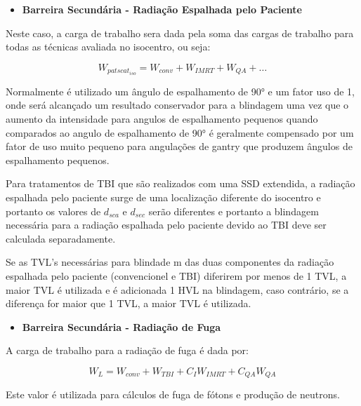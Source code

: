 \documentclass[11pt,a4paper]{article}
\begin{document}
        \begin{itemize}
            \item \textbf{\textcolor{CarnationPink}{Barreira Secundária - Radiação Espalhada pelo Paciente}}
        \end{itemize}

        Neste caso, a carga de trabalho sera dada pela soma das cargas de trabalho para todas as técnicas avaliada no isocentro, ou seja:

        \begin{equation}
            W_{pat scat_{iso}} = W_{conv} + W_{IMRT} + W_{QA} + \dots
        \end{equation}

        Normalmente é utilizado um ângulo de espalhamento de \ang{90} e um fator uso de 1, onde será alcançado um resultado conservador para a blindagem uma vez que o aumento da intensidade para angulos de espalhamento pequenos quando comparados ao angulo de espalhamento de \ang{90} é geralmente compensado por um fator de uso muito pequeno para angulações de gantry que produzem ângulos de espalhamento pequenos.

        Para tratamentos de TBI que são realizados com uma SSD extendida, a radiação espalhada pelo paciente surge de uma localização diferente  do isocentro e portanto os valores de $d_{sca}$ e $d_{sec}$ serão diferentes e portanto a blindagem necessária para a radiação espalhada pelo paciente devido ao TBI deve ser calculada separadamente.

        Se as TVL's necessárias para blindade m das duas componentes da radiação espalhada pelo paciente (convencionel e TBI) diferirem por menos de 1 TVL, a maior TVL é utilizada e é adicionada 1 HVL na blindagem, caso contrário, se a diferença for maior que 1 TVL, a maior TVL é utilizada. 

        \begin{itemize}
            \item \textbf{\textcolor{CarnationPink}{Barreira Secundária - Radiação de Fuga}}
        \end{itemize}


        A carga de trabalho para a radiação de fuga é dada por:

        \begin{equation}
            W_L = W_{conv} + W_{TBI} + C_I W_{IMRT} + C_{QA} W_{QA}
        \end{equation}

        Este valor é utilizada para cálculos de fuga de fótons e produção de neutrons.
\end{document}
